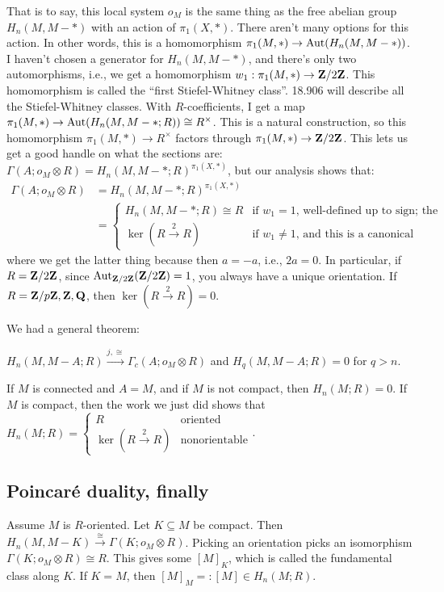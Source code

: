 That is to say, this local system $o_M$ is the same thing as the free abelian group $H_n(M,M-\ast)$ with an action of $\pi_1(X,\ast)$. There aren't many options for this action. In other words, this is a homomorphism $\pi_1(M,\ast)\to \operatorname{Aut}(H_n(M,M-\ast))$. I haven't chosen a generator for $H_n(M,M-\ast)$, and there's only two automorphisms, i.e., we get a homomorphism $w_1:\pi_1(M,\ast)\to\mathbf Z/2\mathbf Z$. This homomorphism is called the ``first Stiefel-Whitney class''. 18.906 will describe all the Stiefel-Whitney classes. With $R$-coefficients, I get a map $\pi_1(M,\ast)\to \operatorname{Aut}(H_n(M,M-\ast;R))\cong R^\times$. This is a natural construction, so this homomorphism $\pi_1(M,\ast)\to R^\times$ factors through $\pi_1(M,\ast)\to\mathbf Z/2\mathbf Z$. This lets us get a good handle on what the sections are: $\Gamma(A;o_M\otimes R)=H_n(M,M-\ast;R)^{\pi_1(X,\ast)}$, but our analysis shows that:
\begin{align*}
\Gamma(A;o_M\otimes R) & =H_n(M,M-\ast;R)^{\pi_1(X,\ast)}\\
& =\begin{cases}
H_n(M,M-\ast;R)\cong R & \text{if }w_1=1\text{, well-defined up to sign; the orientable case}\\
\ker(R\xrightarrow{2}R) & \text{if }w_1\neq 1\text{, and this is a canonical identification}
\end{cases}
\end{align*}
where we get the latter thing because then $a=-a$, i.e., $2a=0$. In particular, if $R=\mathbf Z/2\mathbf Z$, since $\operatorname{Aut}_{\mathbf Z/2\mathbf Z}(\mathbf Z/2\mathbf Z)=1$, you always have a unique orientation. If $R=\mathbf Z/p\mathbf Z,\mathbf Z,\mathbf Q$, then $\ker(R\xrightarrow{2}R)=0$.

We had a general theorem:
\begin{theorem}
$H_n(M,M-A;R)\xrightarrow{j,\cong}\Gamma_c(A;o_M\otimes R)$ and $H_q(M,M-A;R)=0$ for $q>n$.
\end{theorem}
\begin{corollary}
If $M$ is connected and $A=M$, and if $M$ is not compact, then $H_n(M;R)=0$. If $M$ is compact, then the work we just did shows that $H_n(M;R)=\begin{cases}R & \text{oriented} \\ \ker(R\xrightarrow{2}R) & \text{nonorientable}\end{cases}$.
\end{corollary}
\subsection{Poincar\'e duality, finally}
Assume $M$ is $R$-oriented. Let $K\subseteq M$ be compact. Then $H_n(M,M-K)\xrightarrow{\cong}\Gamma(K;o_M\otimes R)$. Picking an orientation picks an isomorphism $\Gamma(K;o_M\otimes R)\cong R$. This gives some $[M]_K$, which is called the fundamental class along $K$. If $K=M$, then $[M]_M=:[M]\in H_n(M;R)$.

